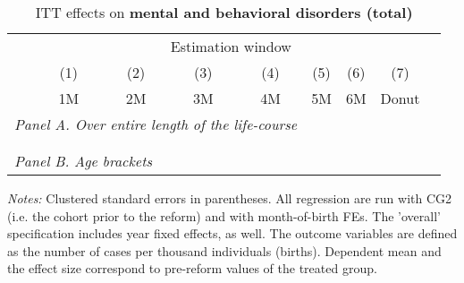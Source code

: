 \vspace*{\fill}
\begin{table}[H] \centering 
	\begin{threeparttable} \centering \caption{ITT effects on \textbf{mental and behavioral disorders (total)}}\label{tab: DD_hopsital2_total}
		{\def\sym#1{\ifmmode^{#1}\else\(^{#1}\)\fi} 
			\begin{tabular}{l*{8}{c}}
				\toprule 
				& \multicolumn{7}{c}{Estimation window} \\ 
				\cmidrule(lr){2-8}
				&\multicolumn{1}{c}{(1)}&\multicolumn{1}{c}{(2)}&\multicolumn{1}{c}{(3)}&\multicolumn{1}{c}{(4)}&\multicolumn{1}{c}{(5)}&\multicolumn{1}{c}{(6)}&\multicolumn{1}{c}{(7)}\\
				&\multicolumn{1}{c}{1M}&\multicolumn{1}{c}{2M}&\multicolumn{1}{c}{3M}&\multicolumn{1}{c}{4M}&\multicolumn{1}{c}{5M}&\multicolumn{1}{c}{6M}&\multicolumn{1}{c}{Donut}\\
				\midrule
				\multicolumn{5}{l}{\emph{Panel A. Over entire length of the life-course}} \\
				 \\ \\
				\multicolumn{5}{l}{\emph{Panel B. Age brackets}} \\
				   
				\bottomrule 
		\end{tabular}}
		\begin{tablenotes} 
			\item \scriptsize \emph{Notes:} Clustered standard errors in parentheses. All regression are run with CG2 (i.e. the cohort prior to the reform) and with month-of-birth FEs. The 'overall' specification includes year fixed effects, as well. The outcome variables are defined as the number of cases per thousand individuals (births). Dependent mean and the effect size correspond to pre-reform values of the treated group.
		\end{tablenotes} 
	\end{threeparttable} 
\end{table}
\vspace*{\fill}\clearpage 